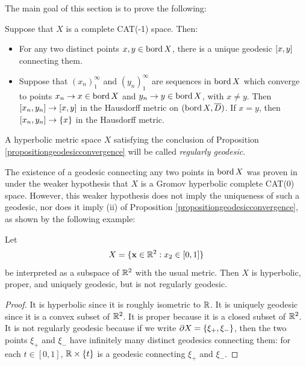 The main goal of this section is to prove the following:

\begin{proposition}
\label{propositiongeodesicconvergence}
Suppose that $X$ is a complete CAT(-1) space. Then:
\begin{itemize}
\item[(i)] For any two distinct points $x,y\in\operatorname{bord} X$, there is a unique geodesic $[x,y]$ connecting them.
\item[(ii)] Suppose that $(x_n)_1^\infty$ and $(y_n)_1^\infty$ are sequences in $\operatorname{bord} X$ which converge to points $x_n\to x\in\operatorname{bord} X$ and $y_n\to y\in\operatorname{bord} X$, with $x\neq y$. Then $[x_n,y_n]\to[x,y]$ in the Hausdorff metric on $(\operatorname{bord} X,\overline{D})$. If $x = y$, then $[x_n,y_n]\to \{x\}$ in the Hausdorff metric.%
\end{itemize}
\end{proposition}

\begin{definition}
\label{definitionregularlygeodesic}
A hyperbolic metric space $X$ satisfying the conclusion of Proposition \ref{propositiongeodesicconvergence} will be called \emph{regularly geodesic}.
\end{definition}

\begin{remark}
The existence of a geodesic connecting any two points in $\operatorname{bord} X$ was proven in \cite[Proposition 0.2]{Buyalo} under the weaker hypothesis that $X$ is a Gromov hyperbolic complete CAT(0) space. However, this weaker hypothesis does not imply the uniqueness of such a geodesic, nor does it imply (ii) of Proposition \ref{propositiongeodesicconvergence}, as shown by the following example:
\end{remark}

\begin{example}
\label{examplestrip}
Let
\[
X = \{\xx\in\R^2: x_2\in[0,1]\}
\]
be interpreted as a subspace of $\R^2$ with the usual metric. Then $X$ is hyperbolic, proper, and uniquely geodesic, but is not regularly geodesic.
\end{example}
\begin{proof}
It is hyperbolic since it is roughly isometric to $\R$. It is uniquely geodesic since it is a convex subset of $\R^2$. It is proper because it is a closed subset of $\R^2$. It is not regularly geodesic because if we write $\partial X = \{\xi_+,\xi_-\}$, then the two points $\xi_+$ and $\xi_-$ have infinitely many distinct geodesics connecting them: for each $t\in[0,1]$, $\R\times\{t\}$ is a geodesic connecting $\xi_+$ and $\xi_-$.
\end{proof}


